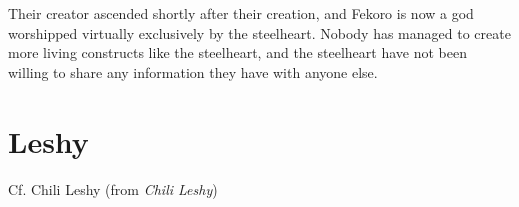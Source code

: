 \documentclass{article}
\begin{document}
Their creator ascended shortly after their creation, and Fekoro is now a god
worshipped virtually exclusively by the steelheart. Nobody has managed to create
more living constructs like the steelheart, and the steelheart have not been
willing to share any information they have with anyone else.

\section{Leshy}

Cf. Chili Leshy (from \emph{Chili Leshy})
\end{document}
